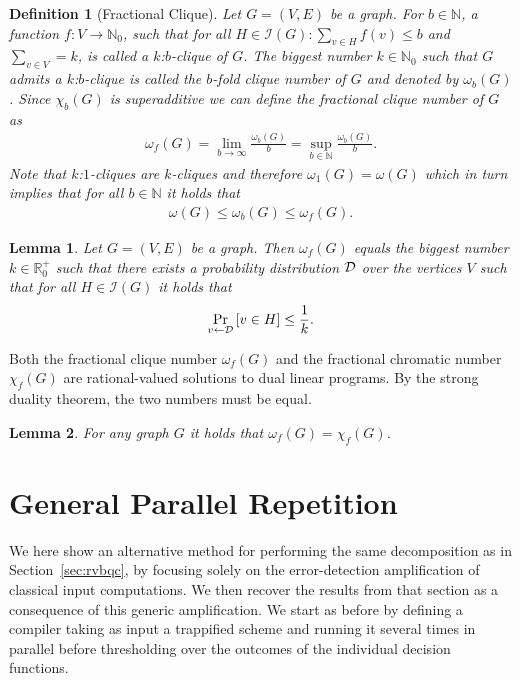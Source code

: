 \documentclass[12pt]{iopart}
\renewcommand{\1}{\mathds{1}}
\newtheorem{lemma}{Lemma}
\newtheorem{definition}{Definition}
\begin{document}
\begin{definition}[Fractional Clique]\label{def:fractional_clique_number}
  Let $G=(V,E)$ be a graph. For $b \in \mathbb{N}$, a function $f : V \to \mathbb{N}_0$, such that for all $H \in \mathcal I(G) : \sum_{v \in H} f(v) \leq b$ and $\sum_{v \in V} = k$, is called a \emph{$k$:$b$-clique} of $G$.
  The biggest number $k \in \mathbb{N}_0$ such that $G$ admits a \emph{$k$:$b$-clique} is called the $b$-fold clique number of $G$ and denoted by $\omega_b(G)$.
  Since $\chi_b(G)$ is superadditive we can define the \emph{fractional clique number} of $G$ as
  \begin{align}
    \omega_f(G) = \lim_{b \to \infty} \frac{\omega_b(G)}{b} = \sup_{b \in \mathbb{N}} \frac{\omega_b(G)}{b}.
  \end{align}
  Note that $k$:$1$-cliques are $k$-cliques and therefore $\omega_1(G) = \omega(G)$ which in turn implies that for all $b \in \mathbb{N}$ it holds that
  \begin{align}
    \omega(G) \leq \omega_b(G) \leq\omega_f(G).
  \end{align}
\end{definition}

\begin{lemma}\label{lemma:fractional_clique_number_probabilistic} Let $G=(V,E)$ be a graph.
  Then $\omega_f(G)$ equals the biggest number $k \in \mathbb{R}^+_0$ such that there exists a probability distribution $\mathcal{D}$ over the vertices $V$ such that for all $H \in \mathcal I(G)$ it holds that
  \begin{align}
    \Pr_{v \gets \mathcal{D}} \left[ v \in H \right] \leq \frac{1}{k}.
	\end{align}
\end{lemma}

Both the fractional clique number $\omega_f(G)$ and the fractional chromatic number $\chi_f(G)$ are rational-valued solutions to dual linear programs.
By the strong duality theorem, the two numbers must be equal.

\begin{lemma}\label{lemma:fractional_equality} For any graph $G$ it holds that $\omega_f(G) = \chi_f(G)$.
\end{lemma}
 
\section{General Parallel Repetition}
\label{app:gen-comp}
We here show an alternative method for performing the same decomposition as in Section~\ref{sec:rvbqc}, by focusing solely on the error-detection amplification of classical input computations. We then recover the results from that section as a consequence of this generic amplification. We start as before by defining a compiler taking as input a trappified scheme and running it several times in parallel before thresholding over the outcomes of the individual decision functions.
\end{document}
